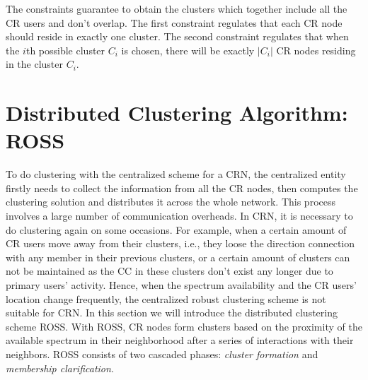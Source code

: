 \documentclass[10pt,journal,compsoc]{IEEEtran}
\theoremstyle{mytheoremstyle}
\theoremstyle{mytheoremstyle}
\theoremstyle{mytheoremstyle}
\newcommand{\ie}{i.e., }
\begin{document}
The constraints guarantee to obtain the clusters which together include all the CR users and don't overlap.
The first constraint regulates that each CR node should reside in exactly one cluster.
The second constraint regulates that when the $i$th possible cluster $C_i$ is chosen, there will be exactly $|C_i|$ CR nodes residing in the cluster $C_i$.







\section{Distributed Clustering Algorithm: ROSS}
\label{ross}
To do clustering with the centralized scheme for a CRN, the centralized entity firstly needs to collect the information from all the CR nodes, then computes the clustering solution and distributes it across the whole network.
This process involves a large number of communication overheads.
In CRN, it is necessary to do clustering again on some occasions.
For example, when a certain amount of CR users move away from their clusters, \ie they loose the direction connection with any member in their previous clusters, or a certain amount of clusters can not be maintained as the CC in these clusters don't exist any longer due to primary users' activity. 
Hence, when the spectrum availability and the CR users' location change frequently, the centralized robust clustering scheme is not suitable for CRN.
%
In this section we will introduce the distributed clustering scheme ROSS.
With ROSS, CR nodes form clusters based on the proximity of the available spectrum in their neighborhood after a series of interactions with their neighbors. 
ROSS consists of two cascaded phases: \textit{cluster formation} and \textit{membership clarification}.
\end{document}
